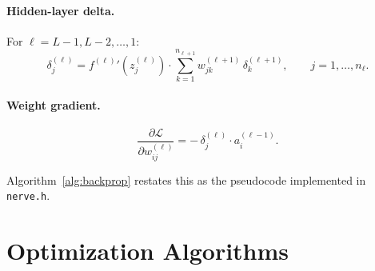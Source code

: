 \documentclass[11pt,a4paper]{article}
\begin{document}
\paragraph{Hidden-layer delta.}
For $\ell = L-1, L-2, \ldots, 1$:
\begin{equation}
  \delta_j^{(\ell)}
    = {f^{(\ell)}}'\!\!\left(z_j^{(\ell)}\right)
      \cdot \sum_{k=1}^{n_{\ell+1}} w_{jk}^{(\ell+1)}\,\delta_k^{(\ell+1)},
  \qquad j = 1,\ldots,n_\ell.
  \label{eq:delta-hidden}
\end{equation}

\paragraph{Weight gradient.}
\begin{equation}
  \frac{\partial\mathcal{L}}{\partial w_{ij}^{(\ell)}}
    = -\,\delta_j^{(\ell)}\cdot a_i^{(\ell-1)}.
  \label{eq:grad}
\end{equation}

Algorithm~\ref{alg:backprop} restates this as the pseudocode implemented
in \texttt{nerve.h}.

\begin{algorithm}[H]
\caption{Backpropagation (single sample)}
\label{alg:backprop}
\BlankLine
{}
\BlankLine
{}
\BlankLine
{}
\end{algorithm}

\section{Optimization Algorithms}
\label{sec:optim}
\end{document}
